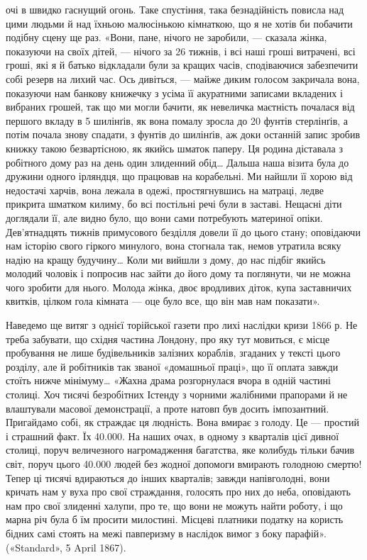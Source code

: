 \parcont{}  %
очі в швидко гаснущий огонь. Таке спустіння, така безнадійність
повисла над цими людьми й над їхньою малюсінькою кімнаткою,
що я не хотів би побачити подібну сцену ще раз. «Вони,
пане, нічого не заробили, — сказала жінка, показуючи на своїх
дітей, — нічого за 26 тижнів, і всі наші гроші витрачені, всі гроші,
які я й батько відкладали були за кращих часів, сподіваючися
забезпечити собі резерв на лихий час. Ось дивіться, — майже
диким голосом закричала вона, показуючи нам банкову книжечку
з усіма її акуратними записами вкладених і вибраних грошей,
так що ми могли бачити, як невеличка маєтність почалася
від першого вкладу в 5 шилінґів, як вона помалу зросла до
20 фунтів стерлінґів, а потім почала знову спадати, з фунтів до
шилінґів, аж доки останній запис зробив книжку такою безвартісною,
як якийсь шматок паперу. Ця родина діставала з робітного
дому раз на день один злиденний обід\dots{} Дальша наша візита
була до дружини одного ірляндця, що працював на корабельні.
Ми найшли її хорою від недостачі харчів, вона лежала в одежі,
простягнувшись на матраці, ледве прикрита шматком килиму,
бо всі постільні речі були в заставі. Нещасні діти доглядали її,
але видно було, що вони сами потребують материної опіки.
Дев’ятнадцять тижнів примусового безділля довели її до цього
стану; оповідаючи нам історію свого гіркого минулого, вона
стогнала так, немов утратила всяку надію на кращу будучину\dots{}
Коли ми вийшли з дому, до нас підбіг якийсь молодий чоловік
і попросив нас зайти до його дому та поглянути, чи не можна
чого зробити для нього. Молода жінка, двоє вродливих діток,
купа заставничих квитків, цілком гола кімната — оце було все,
що він мав нам показати».

Наведемо ще витяг з однієї торійської газети про лихі наслідки
кризи 1866 р. Не треба забувати, що східня частина Лондону,
про яку тут мовиться, є місце пробування не лише будівельників
залізних кораблів, згаданих у тексті цього розділу, але й
робітників так званої «домашньої праці», що її оплата завжди
стоїть нижче мінімуму\dots{} «Жахна драма розгорнулася вчора в
одній частині столиці. Хоч тисячі безробітних Істенду з чорними
жалібними прапорами й не влаштували масової демонстрації,
а проте натовп був досить імпозантний. Пригайдамо собі, як
страждає ця людність. Вона вмирає з голоду. Це — простий і
страшний факт. Їх 40.000. На наших очах, в одному з кварталів
цієї дивної столиці, поруч величезного нагромадження багатства,
яке колибудь тільки бачив світ, поруч цього 40.000 людей без
жодної допомоги вмирають голодною смертю! Тепер ці тисячі
вдираються до інших кварталів; завжди напівголодні, вони кричать
нам у вуха про свої страждання, голосять про них до
неба, оповідають нам про свої злиденні халупи, про те, що вони
не можуть найти роботу, і що марна річ була б їм просити
милостині. Місцеві платники податку на користь бідних самі
стоять на межі павперизму в наслідок вимог з боку парафій».
(«Standard», 5 April 1867).
